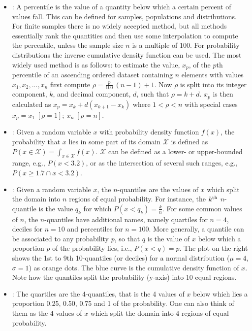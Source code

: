 \documentclass[draftspec]{sbmlpkgspec}
\begin{document}
\begin{itemize}
\item {}:  A percentile is the value of a quantity below which a certain percent of values fall. This can be defined for samples, populations and distributions. For finite samples there is no widely accepted method, but all methods essentially rank the quantities and then use some interpolation to compute the percentile, unless the sample size $ n $ is a multiple of 100. For probability distributions the inverse cumulative density function can be used.  The most widely used method is as follows: to estimate the value, $ x_p $, of the $ p $th percentile of an ascending ordered dataset containing $ n $ elements with values $ x_1, x_2, ... ,x_n $ first compute $ \rho = \frac{p}{100}\,({n}-1)+1 $. Now $ \rho $ is split into its integer component, $ k $, and decimal component, $ d $, such that $ \rho = k + d $. $ x_p $ is then calculated as $ x_p = x_k+d(x_{k+1}-x_k) $ where $ 1 < \rho < n $ with special cases $ x_p = x_1 \; [\rho=1]; \ x_n \; [\rho=n] $.

\item {}:  Given a random variable $ x $ with probability density function $ f(x) $, the probability that $ x $ lies in some part of its domain $ \mathcal{X} $ is defined as $ P(x \in \mathcal{X}) = \int_{x\in\mathcal{X}} f(x) $. $ \mathcal{X} $ can be defined as a lower- or upper-bounded range, e.g., $ P(x < 3.2) $, or as the intersection of several such ranges, e.g., $ P(x \geq 1.7 \cap x < 3.2) $.

\item {}:  Given a random variable $ x $, the $ n $-quantiles are the values of $ x $ which split the domain into $ n $ regions of equal probability. For instance, the $ k\textsuperscript{th} $ $ n $-quantile is the value $ q_k $ for which $ P(x<q_k) = \frac{k}{n} $. For some common values of $ n $, the $ n $-quantiles have additional names, namely quartiles for $ n=4 $, deciles for $ n=10 $ and percentiles for $ n=100 $.
More generally, a quantile can be associated to any probability $ p $, so that $ q $ is the value of $ x $ below which a proportion $ p $ of the probability lies, i.e., $ P(x<q) = p $.
The plot on the right shows the 1st to 9th 10-quantiles (or deciles) for a normal distribution ($ \mu = 4 $, $ \sigma = 1 $) as orange dots. The blue curve is the cumulative density function of $ x $. Note how the quantiles split the probability (y-axis) into 10 equal regions.

\item {}:  The quartiles are the 4-quantiles, that is the 4 values of $ x $ below which lies a proportion 0.25, 0.50, 0.75 and 1 of the probability. One can also think of them as the 4 values of $ x $ which split the domain into 4 regions of equal probability.
\end{itemize}
\end{document}
